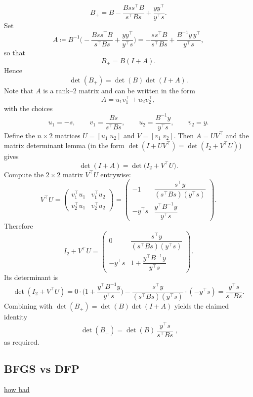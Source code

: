 \documentclass[a4paper, 10pt, dvipdfmx,draft]{article}
\newcommand{\defeq}{\coloneqq}
\begin{document}
\[
    B_{+}=B-\frac{B s s^\top B}{s^\top B s}+\frac{y y^\top}{y^\top s}.
\]
Set
\[
    A \defeq B^{-1}\Big(-\frac{B s s^\top B}{s^\top B s}+\frac{y y^\top}{y^\top s}\Big)
    =-\frac{s s^\top B}{s^\top B s}+\frac{B^{-1}y\,y^\top}{y^\top s},
\]
so that
\[
    B_{+}=B(I+A).
\]
Hence
\begin{equation}
    \det(B_{+})=\det(B)\det(I+A).
\end{equation}
Note that $A$ is a rank--$2$ matrix and can be written in the form
\[
    A=u_1 v_1^\top+u_2 v_2^\top,
\]
with the choices
\[
    u_1=-s,\qquad v_1=\frac{B s}{s^\top B s},\qquad
    u_2=\frac{B^{-1}y}{y^\top s},\qquad v_2=y.
\]
Define the $n\times2$ matrices $U=[u_1\;u_2]$ and $V=[v_1\;v_2]$. Then $A=U V^\top$ and the matrix determinant lemma (in the form $\det(I+UV^\top)=\det(I_2+V^\top U)$) gives
\begin{equation}
    \det(I+A)=\det\big(I_2+V^\top U\big).
\end{equation}
Compute the $2\times2$ matrix $V^\top U$ entrywise:
\[
    V^\top U=
    \begin{pmatrix}
        v_1^\top u_1 & v_1^\top u_2 \\[4pt]
        v_2^\top u_1 & v_2^\top u_2
    \end{pmatrix}
    =
    \begin{pmatrix}
        -1         & \dfrac{s^\top y}{(s^\top B s)(y^\top s)} \\[8pt]
        - y^\top s & \dfrac{y^\top B^{-1}y}{y^\top s}
    \end{pmatrix}.
\]
Therefore
\[
    I_2+V^\top U=
    \begin{pmatrix}
        0          & \dfrac{s^\top y}{(s^\top B s)(y^\top s)} \\[8pt]
        - y^\top s & 1+\dfrac{y^\top B^{-1}y}{y^\top s}
    \end{pmatrix}.
\]
Its determinant is
\[
    \det(I_2+V^\top U)
    =0\cdot\Big(1+\frac{y^\top B^{-1}y}{y^\top s}\Big)
    -\frac{s^\top y}{(s^\top B s)(y^\top s)}\cdot(-y^\top s)
    =\frac{y^\top s}{s^\top B s}.
\]
Combining with $\det(B_{+})=\det(B)\det(I+A)$ yields the claimed identity
\[
    \boxed{\;\det(B_{+})=\det(B)\,\frac{y^\top s}{s^\top B s}\;},
\]
as required.

\subsection{BFGS vs DFP}

\href{https://link.springer.com/article/10.1007/BF01582161}{how bad}
\end{document}
